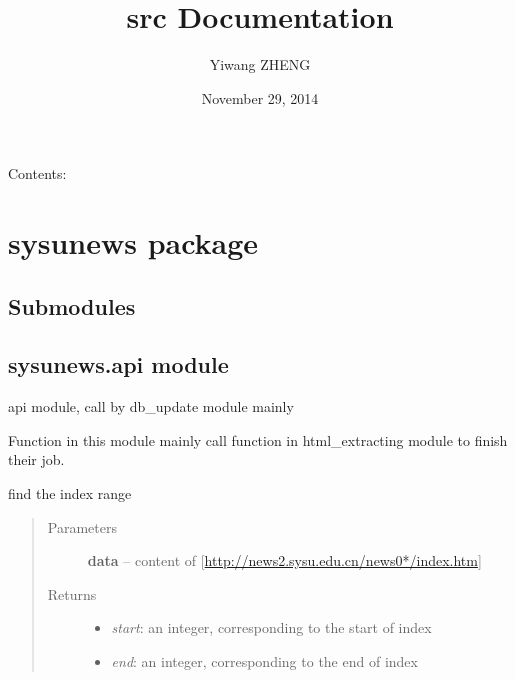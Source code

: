 \documentclass[letterpaper,10pt,english]{sphinxmanual}
\title{src Documentation}
\date{November 29, 2014}
\author{Yiwang ZHENG}
\begin{document}
\maketitle
\tableofcontents
{}\label{index::doc}


Contents:


\chapter{sysunews package}
\label{sysunews::doc}\label{sysunews:welcome-to-sysunews-s-documentation}\label{sysunews:sysunews-package}

\section{Submodules}
\label{sysunews:submodules}

\section{sysunews.api module}
\label{sysunews:sysunews-api-module}\label{sysunews:module-sysunews.api}
api module, call by db\_update module mainly

Function in this module mainly call function in html\_extracting module to finish their job.

\begin{fulllineitems}
\label{sysunews:sysunews.api.get_index_range}
find the index range
\begin{quote}\begin{description}
\item[{Parameters}] \leavevmode
\textbf{data} -- content of {[}\href{http://news2.sysu.edu.cn/news0*/index.htm}{http://news2.sysu.edu.cn/news0*/index.htm}{]}

\item[{Returns}] \leavevmode
\begin{itemize}
\item {} 
\emph{start}: an integer, corresponding to the start of index

\item {} 
\emph{end}: an integer, corresponding to the end of index

\end{itemize}


\end{description}\end{quote}

\end{fulllineitems}
\end{document}
